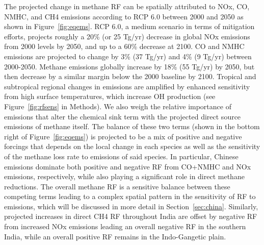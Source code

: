The projected change in methane RF can be spatially attributed to NOx, CO, NMHC, and CH4 emissions according to RCP 6.0 between 2000 and 2050 as shown in Figure~\ref{fig:eqems}. RCP 6.0, a medium scenario in terms of mitigation efforts, projects roughly a 20\% (or 25 Tg/yr) decrease in global NOx emissions from 2000 levels by 2050, and up to a 60\% decrease at 2100. CO and NMHC emissions are projected to change by 3\% (37 Tg/yr) and 4\% (9 Tg/yr) between 2000-2050. Methane emissions globally increase by 18\% (55 Tg/yr) by 2050, but then decrease by a similar margin below the 2000 baseline by 2100. Tropical and subtropical regional changes in emissions are amplified by enhanced sensitivity from high surface temperatures, which increase OH production (see Figure~\ref{fig:rfsens} in Methods). We also weigh the relative importance of emissions that alter the chemical sink term with the projected direct source emissions of methane itself. The balance of these two terms (shown in the bottom right of Figure~\ref{fig:eqems}) is projected to be a mix of positive and negative forcings that depends on the local change in each species as well as the sensitivity of the methane loss rate to emissions of said species. In particular, Chinese emissions dominate both positive and negative RF from CO+NMHC and NOx emissions, respectively, while also playing a significant role in direct methane reductions.  The overall methane RF is a sensitive balance between these competing terms leading to a complex spatial pattern in the sensitivity of RF to emissions, which will be discussed in more detail in Section~\ref{sec:china}.  Similarly, projected increases in direct CH4 RF throughout India are offset by negative RF from increased NOx emissions leading an overall negative RF in the southern India, while an overall positive RF remains in the Indo-Gangetic plain.  

